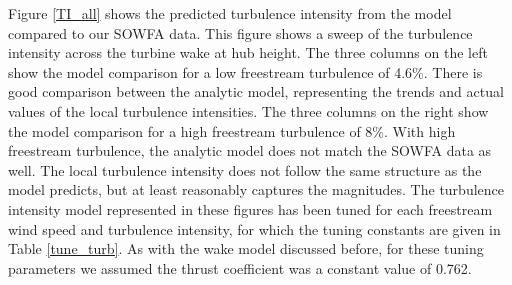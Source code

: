 \documentclass[11pt,letterpaper]{article}
\begin{document}
Figure \ref{TI_all} shows the predicted turbulence intensity from the model compared to our SOWFA data. This figure shows a sweep of the turbulence intensity across the turbine wake at hub height. The three columns on the left show the model comparison for a low freestream turbulence of 4.6\%. There is good comparison between the analytic model, representing the trends and actual values of the local turbulence intensities. The three columns on the right show the model comparison for a high freestream turbulence of 8\%. With high freestream turbulence, the analytic model does not match the SOWFA data as well. The local turbulence intensity does not follow the same structure as the model predicts, but at least reasonably captures the magnitudes. The turbulence intensity model represented in these figures has been tuned for each freestream wind speed and turbulence intensity, for which the tuning constants are given in Table \ref{tune_turb}. As with the wake model discussed before, for these tuning parameters we assumed the thrust coefficient was a constant value of 0.762.
% 
\end{document}
